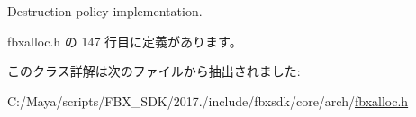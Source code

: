 Destruction policy implementation. 



 fbxalloc.\+h の 147 行目に定義があります。



このクラス詳解は次のファイルから抽出されました\+:\begin{DoxyCompactItemize}
\item 
C\+:/\+Maya/scripts/\+F\+B\+X\+\_\+\+S\+D\+K/2017./include/fbxsdk/core/arch/\hyperlink{fbxalloc_8h}{fbxalloc.\+h}\end{DoxyCompactItemize}
